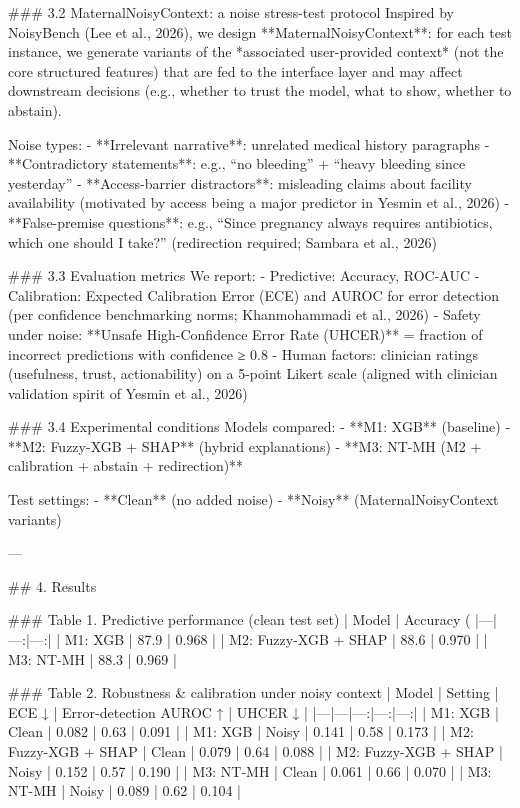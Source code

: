 ### 3.2 MaternalNoisyContext: a noise stress-test protocol  
Inspired by NoisyBench (Lee et al., 2026), we design **MaternalNoisyContext**: for each test instance, we generate variants of the *associated user-provided context* (not the core structured features) that are fed to the interface layer and may affect downstream decisions (e.g., whether to trust the model, what to show, whether to abstain).

Noise types:
- **Irrelevant narrative**: unrelated medical history paragraphs  
- **Contradictory statements**: e.g., “no bleeding” + “heavy bleeding since yesterday”  
- **Access-barrier distractors**: misleading claims about facility availability (motivated by access being a major predictor in Yesmin et al., 2026)  
- **False-premise questions**: e.g., “Since pregnancy always requires antibiotics, which one should I take?” (redirection required; Sambara et al., 2026)

### 3.3 Evaluation metrics  
We report:
- Predictive: Accuracy, ROC-AUC  
- Calibration: Expected Calibration Error (ECE) and AUROC for error detection (per confidence benchmarking norms; Khanmohammadi et al., 2026)  
- Safety under noise: **Unsafe High-Confidence Error Rate (UHCER)** = fraction of incorrect predictions with confidence ≥ 0.8  
- Human factors: clinician ratings (usefulness, trust, actionability) on a 5-point Likert scale (aligned with clinician validation spirit of Yesmin et al., 2026)

### 3.4 Experimental conditions  
Models compared:
- **M1: XGB** (baseline)  
- **M2: Fuzzy-XGB + SHAP** (hybrid explanations)  
- **M3: NT-MH (M2 + calibration + abstain + redirection)**  

Test settings:
- **Clean** (no added noise)  
- **Noisy** (MaternalNoisyContext variants)

---

## 4. Results  

### Table 1. Predictive performance (clean test set)  
| Model | Accuracy (%
|---|---:|---:|
| M1: XGB | 87.9 | 0.968 |
| M2: Fuzzy-XGB + SHAP | 88.6 | 0.970 |
| M3: NT-MH | 88.3 | 0.969 |

### Table 2. Robustness & calibration under noisy context  
| Model | Setting | ECE ↓ | Error-detection AUROC ↑ | UHCER ↓ |
|---|---|---:|---:|---:|
| M1: XGB | Clean | 0.082 | 0.63 | 0.091 |
| M1: XGB | Noisy | 0.141 | 0.58 | 0.173 |
| M2: Fuzzy-XGB + SHAP | Clean | 0.079 | 0.64 | 0.088 |
| M2: Fuzzy-XGB + SHAP | Noisy | 0.152 | 0.57 | 0.190 |
| M3: NT-MH | Clean | 0.061 | 0.66 | 0.070 |
| M3: NT-MH | Noisy | 0.089 | 0.62 | 0.104 |

